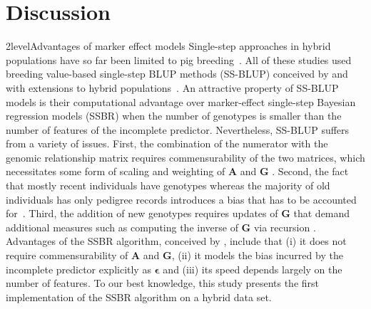 \documentclass[12pt,titlepage]{article}
\begin{document}
\section*{Discussion}
\Genetics2level{Advantages of marker effect models}
Single-step approaches in hybrid populations have so far been limited to pig
breeding~\cite{Xiang2015,Xiang2016,Tusell2016}.
All of these studies used breeding value-based single-step BLUP methods
(SS-BLUP) conceived by  and  with
extensions to hybrid populations~\cite{Christensen2014,Christensen2015}.
An attractive property of SS-BLUP models is their computational advantage over 
marker-effect single-step Bayesian regression models (SSBR) when the number of 
genotypes is smaller than the number of features of the incomplete predictor.
Nevertheless, SS-BLUP suffers from a variety of issues.
First, the combination of the numerator with the genomic relationship matrix
requires commensurability of the two matrices, which necessitates some form of
scaling and weighting of $\mathbf{A}$ and $\mathbf{G}$
\cite{Christensen2012,Christensen2012a}.
Second, the fact that mostly recent individuals have genotypes whereas the 
majority of old individuals has only pedigree records introduces a bias that 
has to be accounted for~\cite{Vitezica2011,Legarra2015,Garcia-Baccino2017}.
Third, the addition of new genotypes requires updates of $\mathbf{G}$ that
demand additional measures such as computing the inverse of $\mathbf{G}$ via
recursion
\cite{Misztal2014,Misztal2016,Misztal2016a,Fragomeni2015,Masuda2016,Pocrnic2016}.
Advantages of the SSBR algorithm, conceived by , include
that (i) it does not require commensurability of $\mathbf{A}$ and $\mathbf{G}$, 
(ii) it models the bias incurred by the incomplete predictor explicitly as 
$\mathbf{\epsilon}$ and (iii) its speed depends largely on the number of 
features.
To our best knowledge, this study presents the first implementation of the SSBR 
algorithm on a hybrid data set.
\end{document}
